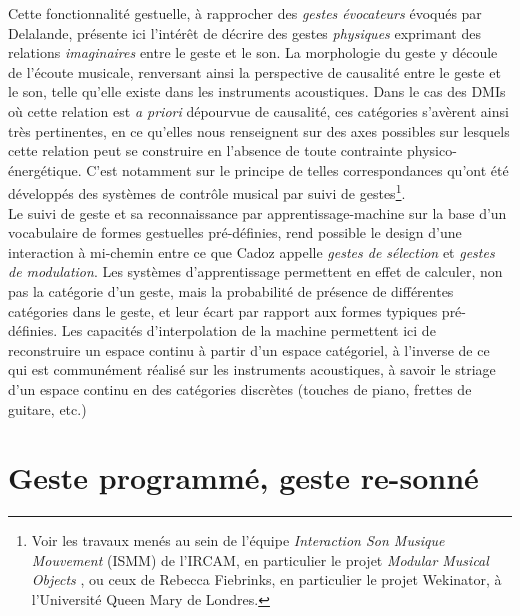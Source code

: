 \indent Cette fonctionnalité gestuelle, à rapprocher des \textit{gestes évocateurs} évoqués par Delalande, présente ici l'intérêt de décrire des gestes \textit{physiques} exprimant des relations \textit{imaginaires} entre le geste et le son. La morphologie du geste y découle de l'écoute musicale, renversant ainsi la perspective de causalité entre le geste et le son, telle qu'elle existe dans les instruments acoustiques. Dans le cas des \glspl{DMI} où cette relation est \textit{a priori} dépourvue de causalité, ces catégories s'avèrent ainsi très pertinentes, en ce qu'elles nous renseignent sur des axes possibles sur lesquels cette relation peut se construire en l'absence de toute contrainte physico-énergétique. C'est notamment sur le principe de telles correspondances qu'ont été développés des systèmes de contrôle musical par suivi de gestes\footnote{Voir les travaux menés au sein de l'équipe \textit{Interaction Son Musique Mouvement} (ISMM) de l'\gls{IRCAM}, en particulier le projet \textit{Modular Musical Objects} \cite{caramiaux_mapping_2014, francoise_motion-sound_2015}, ou ceux de Rebecca Fiebrinks, en particulier le projet Wekinator, \cite{fiebrink_wekinator:_2010} à l'Université Queen Mary de Londres.}.\\
\indent Le suivi de geste et sa reconnaissance par apprentissage-machine sur la base d'un vocabulaire de formes gestuelles pré-définies, rend possible le design d'une interaction à mi-chemin entre ce que Cadoz appelle \textit{gestes de sélection} et \textit{gestes de modulation}. Les systèmes d'apprentissage permettent en effet de calculer, non pas la catégorie d'un geste, mais la probabilité de présence de différentes catégories dans le geste, et leur écart par rapport aux formes typiques pré-définies. Les capacités d'interpolation de la machine permettent ici de reconstruire un espace continu à partir d'un espace catégoriel, à l'inverse de ce qui est communément réalisé sur les instruments acoustiques, à savoir le striage d'un espace continu en des catégories discrètes (touches de piano, frettes de guitare, etc.)



\section{Geste programmé, geste re-sonné}
\label{sec:gesture:instrumental_to_musical}

